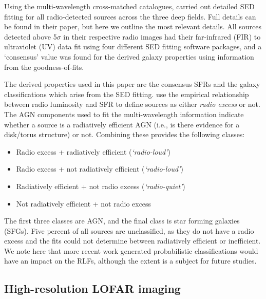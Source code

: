 \documentclass[usenatbib,fleqn,letters]{mnras}
\begin{document}
Using the multi-wavelength cross-matched catalogues,  carried out detailed SED fitting for all radio-detected sources across the three deep fields. Full details can be found in their paper, but here we outline the most relevant details. All sources detected above 5$\sigma$ in their respective radio images had their far-infrared (FIR) to ultraviolet (UV) data fit using four different SED fitting software packages, and a `consensus' value was found for the derived galaxy properties using information from the goodness-of-fits.

The derived properties used in this paper are the consensus SFRs and the galaxy classifications which arise from the SED fitting.  use the empirical relationship between radio luminosity and SFR to define sources as either \textit{radio excess} or not. The AGN components used to fit the multi-wavelength information indicate whether a source is a radiatively efficient AGN (i.e., is there evidence for a disk/torus structure) or not. Combining these provides the following classes:
\begin{itemize}
    \item Radio excess + radiatively efficient (\textit{`radio-loud'})
    \item Radio excess + not radiatively efficient (\textit{`radio-loud'})
    \item Radiatively efficient + not radio excess (\textit{`radio-quiet'})
    \item Not radiatively efficient + not radio excess
\end{itemize}
The first three classes are AGN, and the final class is star forming galaxies (SFGs).  Five percent of all sources are unclassified, as they do not have a radio excess and the fits could not determine between radiatively efficient or inefficient. We note here that more recent work generated probabilistic classifications \citep{drake_lofar_2024} would have an impact on the RLFs, although the extent is a subject for future studies. 


\subsection{High-resolution LOFAR imaging}
\label{subsec:highres}
\end{document}
